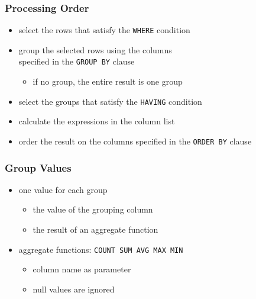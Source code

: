 \documentclass[dvipsnames]{beamer}
\theoremstyle{plain}
\begin{document}
\begin{frame}
  \frametitle{Processing Order}

  \begin{itemize}
    \item select the rows that satisfy the \lstinline!WHERE! condition

    \pause
    \item group the selected rows using the columns\\
      specified in the \lstinline!GROUP BY! clause
    \begin{itemize}
      \item if no group, the entire result is one group
    \end{itemize}

    \pause
    \item select the groups that satisfy the \lstinline!HAVING! condition

    \pause
    \item calculate the expressions in the column list

    \pause
    \item order the result on the columns
      specified in the \lstinline!ORDER BY! clause
  \end{itemize}
\end{frame}

\begin{frame}[fragile]
  \frametitle{Group Values}

  \begin{itemize}
    \item one value for each group
    \begin{itemize}
      \item the value of the grouping column
      \item the result of an aggregate function
    \end{itemize}

    \pause
    \medskip
    \item aggregate functions: \lstinline!COUNT SUM AVG MAX MIN!
    \begin{itemize}
      \item column name as parameter
      \item null values are ignored
    \end{itemize}
  \end{itemize}
\end{frame}
\end{document}
